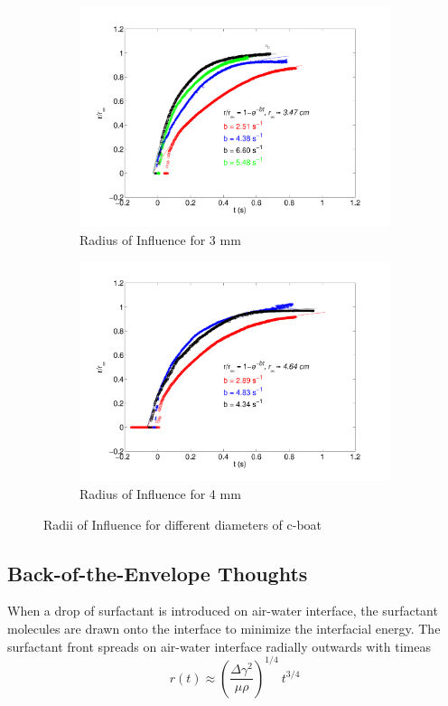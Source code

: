 \documentclass[12pt]{article}
\begin{document}
\begin{figure}[h]
\begin{subfigure}[h]{0.5\textwidth}
       \includegraphics[scale=0.3]{roi_3mm_250mm.pdf}
       \caption{Radius of Influence for 3 mm}
       \label{fig:roi3mm}
	\end{subfigure}
	\hfill
	\begin{subfigure}[h]{0.5\textwidth}
    \centering
       \includegraphics[scale=0.3]{roi_4mm_250mm.pdf}
       \caption{Radius of Influence for 4 mm}
       \label{fig:roi4mm}
	\end{subfigure}
	\caption{Radii of Influence for different diameters of c-boat}
	\label{fig:roiAll}
\end{figure}

\subsection{Back-of-the-Envelope Thoughts}
When a drop of surfactant is introduced on air-water interface, the surfactant molecules are drawn onto the interface to minimize the interfacial energy. The surfactant front spreads on air-water interface radially outwards with time\footnotemark[\ref{ref:mmb}] as 
\begin{equation}\label{eq:rnosub}
r(t) \approx \left(\frac{\Delta \gamma^{2}}{\mu \rho}\right)^{1/4}\ t^{3/4}
\end{equation}
\end{document}
